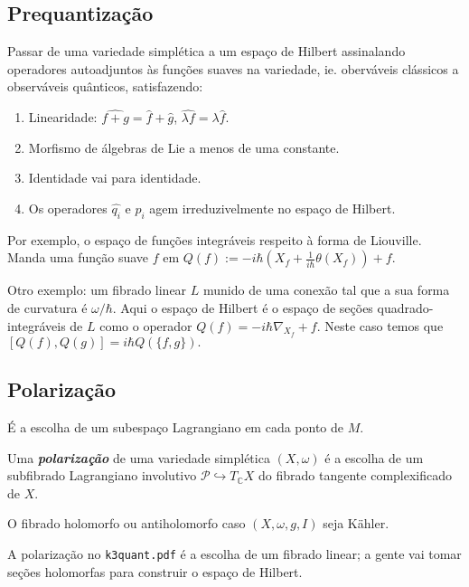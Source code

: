 \subsection{Prequantização}

Passar de uma variedade simplética a um espaço de Hilbert assinalando operadores autoadjuntos às funções suaves na variedade, ie. oberváveis clássicos a observáveis quânticos, satisfazendo:
\begin{enumerate}
	\item Linearidade: $\widehat{f+g}=\hat{f}+\hat{g}$, $\widehat{\lambda f}=\lambda\hat{f}$.
	\item Morfismo de álgebras de Lie a menos de uma constante.
	\item Identidade vai para identidade.
	\item Os operadores $\hat{q_i}$ e $\hat{p_i}$ agem irreduzivelmente no espaço de Hilbert.
\end{enumerate}


Por exemplo, o espaço de funções integráveis respeito à forma de Liouville. Manda uma função suave $f$ em $Q(f):=-i\hbar \left( X_f+\frac{1}{i\hbar}\theta(X_f) \right) +f$.

Otro exemplo: um fibrado linear $L$ munido de uma conexão tal que a sua forma de curvatura é $ \omega /\hbar$. Aqui o espaço de Hilbert é o espaço de seções quadrado-integráveis de $L$ como o operador $Q(f)=-i\hbar \nabla_{X_f}+f$. Neste caso temos que $[Q(f),Q(g)]=i\hbar Q(\{f,g\}).$

\subsection{Polarização}

É a escolha de um subespaço Lagrangiano em cada ponto de $M$.

\begin{defn}
	Uma \textit{\textbf{polarização}} de uma variedade simplética $(X,\omega )$ é a escolha de um subfibrado Lagrangiano involutivo $\mathcal{P}\hookrightarrow T_{\mathbb{C}}X$ do fibrado tangente complexificado de $X$.
\end{defn}

\begin{example}
	O fibrado holomorfo ou antiholomorfo caso $(X,\omega,g,I)$ seja K\"ahler.
\end{example}

A polarização no  \texttt{k3quant.pdf} é a escolha de um fibrado linear; a gente vai tomar seções holomorfas para construir o espaço de Hilbert.

